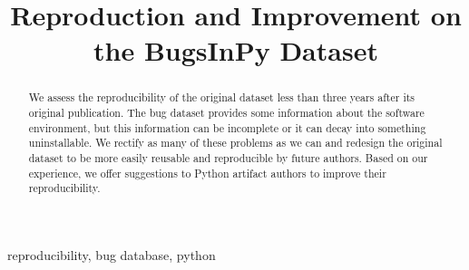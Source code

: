 \documentclass[conference]{IEEEtran}
\begin{document}
\title{Reproduction and Improvement on the BugsInPy Dataset}

\author{
\and  
{}
\and
{}
}

\maketitle

\begin{abstract}
  We assess the reproducibility of the original dataset less than three years after its original publication.
  The bug dataset provides some information about the software environment, but this information can be incomplete or it can decay into something uninstallable.
  We rectify as many of these problems as we can and redesign the original dataset to be more easily reusable and reproducible by future authors.
  Based on our experience, we offer suggestions to Python artifact authors to improve their reproducibility. 
\end{abstract}

\begin{IEEEkeywords}
reproducibility, bug database, python
\end{IEEEkeywords}





\printbibliography

\end{document}
